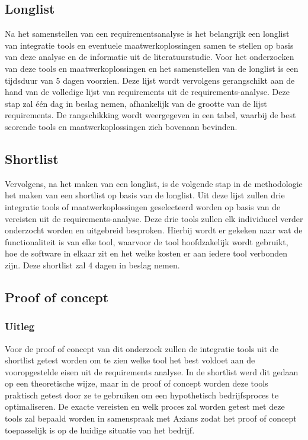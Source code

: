 \subsection{Longlist}
\label{sec:Longlist}

Na het samenstellen van een requirementsanalyse is het belangrijk een longlist van integratie tools en eventuele maatwerkoplossingen samen te stellen op basis van deze
analyse en de informatie uit de literatuurstudie. Voor het onderzoeken van deze tools en maatwerkoplossingen en het samenstellen van de longlist is een tijdsduur van 5 dagen voorzien. Deze lijst wordt vervolgens gerangschikt aan de hand van de volledige lijst van requirements uit de requirements-analyse. Deze stap zal één dag in beslag nemen, afhankelijk van de grootte van de lijst requirements. De rangschikking wordt weergegeven in een tabel, waarbij de best scorende tools en maatwerkoplossingen zich bovenaan bevinden.

\subsection{Shortlist}
\label{sec:Shortlist}

Vervolgens, na het maken van een longlist, is de volgende stap in de methodologie het maken van een shortlist op basis van de longlist. Uit deze lijst zullen drie integratie tools of maatwerkoplossingen geselecteerd worden op basis van de vereisten uit de requirements-analyse. Deze drie tools zullen elk individueel verder onderzocht worden en uitgebreid besproken. Hierbij wordt er gekeken naar wat de functionaliteit is van elke tool, waarvoor de tool hoofdzakelijk wordt gebruikt, hoe de software in elkaar zit en het welke kosten er aan iedere tool verbonden zijn. Deze shortlist zal 4 dagen in beslag nemen.

\subsection{Proof of concept}
\label{sec:Proof of concept}

\subsubsection{Uitleg}
\label{sec:Uitleg}

Voor de proof of concept van dit onderzoek zullen de integratie tools uit de shortlist getest worden om te zien welke tool het best voldoet aan de vooropgestelde eisen uit de requirements analyse. In de shortlist werd dit gedaan op een theoretische wijze, maar in de proof of concept worden deze tools praktisch getest door ze te gebruiken om een hypothetisch bedrijfsproces te optimaliseren. De exacte vereisten en welk proces zal worden getest met deze tools zal bepaald worden in samenspraak met Axians zodat het proof of concept toepasselijk is op de huidige situatie van het bedrijf.


